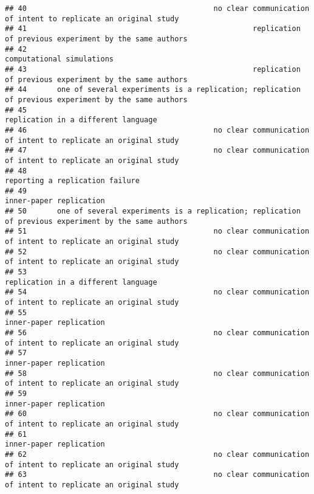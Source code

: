 \documentclass[
  english,
  man]{apa6}
\begin{document}
\begin{verbatim}
## 40                                           no clear communication of intent to replicate an original study
## 41                                                    replication of previous experiment by the same authors
## 42                                                                                 computational simulations
## 43                                                    replication of previous experiment by the same authors
## 44       one of several experiments is a replication; replication of previous experiment by the same authors
## 45                                                                       replication in a different language
## 46                                           no clear communication of intent to replicate an original study
## 47                                           no clear communication of intent to replicate an original study
## 48                                                                           reporting a replication failure
## 49                                                                                   inner-paper replication
## 50       one of several experiments is a replication; replication of previous experiment by the same authors
## 51                                           no clear communication of intent to replicate an original study
## 52                                           no clear communication of intent to replicate an original study
## 53                                                                       replication in a different language
## 54                                           no clear communication of intent to replicate an original study
## 55                                                                                   inner-paper replication
## 56                                           no clear communication of intent to replicate an original study
## 57                                                                                   inner-paper replication
## 58                                           no clear communication of intent to replicate an original study
## 59                                                                                   inner-paper replication
## 60                                           no clear communication of intent to replicate an original study
## 61                                                                                   inner-paper replication
## 62                                           no clear communication of intent to replicate an original study
## 63                                           no clear communication of intent to replicate an original study

\end{verbatim}
\end{document}
